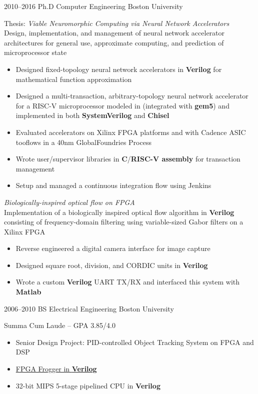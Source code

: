\documentclass[]{friggeri-cv} %
\begin{document}
\begin{entrylist}


\entry
{2010--2016}
{Ph.D {\normalfont Computer Engineering}}
{Boston University}
{Thesis: \emph{Viable Neuromorphic Computing via Neural Network Accelerators} \\
  Design, implementation, and management of neural network accelerator architectures for general use, approximate computing, and prediction of microprocessor state
  \begin{itemize}
  \item Designed fixed-topology neural network accelerators in \textbf{Verilog} for mathematical function approximation
  \item Designed a multi-transaction, arbitrary-topology neural network accelerator for a RISC-V microprocessor modeled in \textbf{\CPP} (integrated with \textbf{gem5}) and implemented in both \textbf{SystemVerilog} and \textbf{Chisel}
  \item Evaluated accelerators on Xilinx FPGA platforms and with Cadence ASIC tooflows in a 40nm GlobalFoundries Process
  \item Wrote user/supervisor libraries in \textbf{C}/\textbf{RISC-V assembly} for transaction management
  \item Setup and managed a continuous integration flow using Jenkins
  \end{itemize}
  \emph{Biologically-inspired optical flow on FPGA} \\
  Implementation of a biologically inspired optical flow algorithm in \textbf{Verilog} consisting of frequency-domain filtering using variable-sized Gabor filters on a Xilinx FPGA
  \begin{itemize}
  \item Reverse engineered a digital camera interface for image capture
  \item Designed square root, division, and CORDIC units in \textbf{Verilog}
  \item Wrote a custom \textbf{Verilog} UART TX/RX and interfaced this system with \textbf{Matlab}
  \end{itemize}
}


\entry
{2006--2010}
{BS {\normalfont Electrical Engineering}}
{Boston University}
{Summa Cum Laude -- GPA 3.85/4.0
  \begin{itemize}
  \item Senior Design Project: PID-controlled Object Tracking System on FPGA and DSP
  \item \href{https://www.youtube.com/watch?v=S2LgUL5JLqQ}{FPGA Frogger in \textbf{Verilog}}
  \item 32-bit MIPS 5-stage pipelined CPU in \textbf{Verilog}
  \end{itemize}
}


\end{entrylist}
\end{document}
